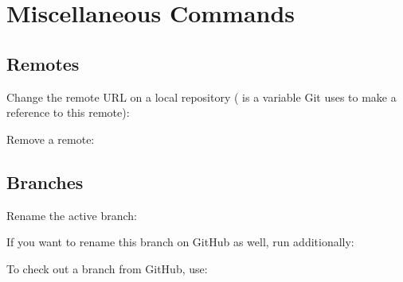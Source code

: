 \section{Miscellaneous Commands}\label{git-misc-commands}


\subsection{Remotes}\label{git-remote}

\begin{flushleft}
	Change the remote URL on a local repository ( is a variable Git
	uses to make a reference to this remote):
\end{flushleft}

\begin{flushleft}
\end{flushleft}

\begin{flushleft}
	Remove a remote:
\end{flushleft}

\begin{flushleft}
\end{flushleft}


\subsection{Branches}\label{git-branch}

\begin{flushleft}
	Rename the active branch:
\end{flushleft}

\begin{flushleft}
\end{flushleft}

\begin{flushleft}
	If you want to rename this branch on GitHub as well, run additionally:
\end{flushleft}

\begin{flushleft}
\end{flushleft}

\begin{flushleft}
	To check out a branch from GitHub, use:
\end{flushleft}

